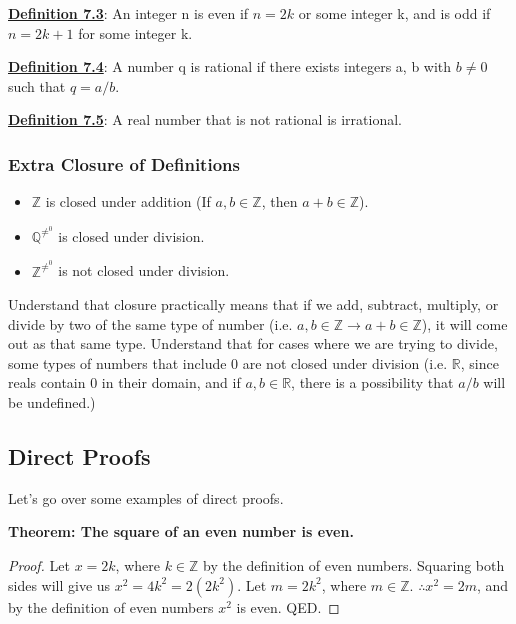 \textbf{\underline{Definition 7.3}}: An integer n is even if $n=2k$ or some integer k, and is odd if $n=2k+1$ for some integer k.

\textbf{\underline{Definition 7.4}}: A number q is rational if there exists integers a, b with $b \neq 0$ such that $q = a/b$.

\textbf{\underline{Definition 7.5}}: A real number that is not rational is irrational.

\subsubsection{Extra Closure of Definitions}
\begin{itemize}
    \item $\mathbb{Z}$ is closed under addition (If $a,b \in \mathbb{Z}$, then $a+b \in \mathbb{Z}$).
    \item $\mathbb{Q}^\neq^0$ is closed under division.
    \item $\mathbb{Z}^\neq^0$ is not closed under division.
\end{itemize}

Understand that closure practically means that if we add, subtract, multiply, or divide by two of the same type of number (i.e. $a,b \in \mathbb{Z} \rightarrow a+b \in \mathbb{Z}$), it will come out as that same type. Understand that for cases where we are trying to divide, some types of numbers that include 0 are not closed under division (i.e. $\mathbb{R}$, since reals contain 0 in their domain, and if $a,b \in \mathbb{R}$, there is a possibility that $a/b$ will be undefined.)

\subsection{Direct Proofs}
Let's go over some examples of direct proofs.

\begin{example}
    \textbf{Theorem: The square of an even number is even.}
\end{example}

\begin{proof}
Let $x = 2k$, where $k \in \mathbb{Z}$ by the definition of even numbers. Squaring both sides will give us $x^2=4k^2=2(2k^2)$. Let $m=2k^2$, where $m\in \mathbb{Z}$. $\therefore x^2=2m$, and by the definition of even numbers $x^2$ is even. QED.
\end{proof}

\newpage

